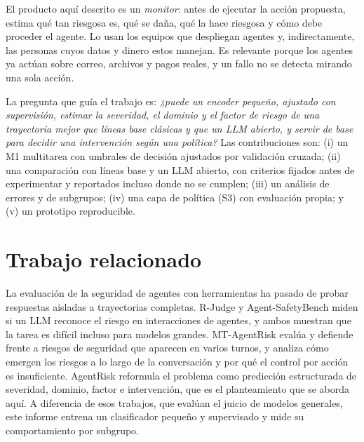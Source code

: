 \documentclass[conference]{IEEEtran}
\begin{document}
El producto aquí descrito es un \emph{monitor}: antes de ejecutar la acción propuesta, estima qué tan riesgosa es, qué se daña, qué la hace riesgosa y cómo debe proceder el agente. Lo usan los equipos que despliegan agentes y, indirectamente, las personas cuyos datos y dinero estos manejan. Es relevante porque los agentes ya actúan sobre correo, archivos y pagos reales, y un fallo no se detecta mirando una sola acción.

La pregunta que guía el trabajo es: \emph{¿puede un encoder pequeño, ajustado con supervisión, estimar la severidad, el dominio y el factor de riesgo de una trayectoria mejor que líneas base clásicas y que un LLM abierto, y servir de base para decidir una intervención según una política?} Las contribuciones son: (i) un M1 multitarea con umbrales de decisión ajustados por validación cruzada; (ii) una comparación con líneas base y un LLM abierto, con criterios fijados antes de experimentar y reportados incluso donde no se cumplen; (iii) un análisis de errores y de subgrupos; (iv) una capa de política (S3) con evaluación propia; y (v) un prototipo reproducible.

\section{Trabajo relacionado}
La evaluación de la seguridad de agentes con herramientas ha pasado de probar respuestas aisladas a trayectorias completas. R-Judge \cite{yuan2024} y Agent-SafetyBench \cite{zhang2024} miden si un LLM reconoce el riesgo en interacciones de agentes, y ambos muestran que la tarea es difícil incluso para modelos grandes. MT-AgentRisk \cite{li2026} evalúa y defiende frente a riesgos de seguridad que aparecen en varios turnos, y \cite{wang2026} analiza cómo emergen los riesgos a lo largo de la conversación y por qué el control por acción es insuficiente. AgentRisk \cite{task2026} reformula el problema como predicción estructurada de severidad, dominio, factor e intervención, que es el planteamiento que se aborda aquí. A diferencia de esos trabajos, que evalúan el juicio de modelos generales, este informe entrena un clasificador pequeño y supervisado y mide su comportamiento por subgrupo.

\end{document}
